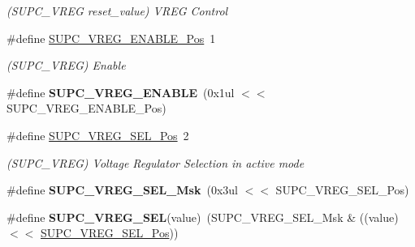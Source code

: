 \begin{DoxyCompactItemize}
\begin{DoxyCompactList}\small\item\em (S\+U\+P\+C\+\_\+\+V\+R\+E\+G reset\+\_\+value) V\+R\+E\+G Control \end{DoxyCompactList}\item 
\hypertarget{group___s_a_m_l21___s_u_p_c_ga02f034caa03f4c23c28006bec76b4ebf}{}\#define \hyperlink{group___s_a_m_l21___s_u_p_c_ga02f034caa03f4c23c28006bec76b4ebf}{S\+U\+P\+C\+\_\+\+V\+R\+E\+G\+\_\+\+E\+N\+A\+B\+L\+E\+\_\+\+Pos}~1\label{group___s_a_m_l21___s_u_p_c_ga02f034caa03f4c23c28006bec76b4ebf}

\begin{DoxyCompactList}\small\item\em (S\+U\+P\+C\+\_\+\+V\+R\+E\+G) Enable \end{DoxyCompactList}\item 
\hypertarget{group___s_a_m_l21___s_u_p_c_ga0f5d73e477b0e4791d17587824160648}{}\#define {\bfseries S\+U\+P\+C\+\_\+\+V\+R\+E\+G\+\_\+\+E\+N\+A\+B\+L\+E}~(0x1ul $<$$<$ S\+U\+P\+C\+\_\+\+V\+R\+E\+G\+\_\+\+E\+N\+A\+B\+L\+E\+\_\+\+Pos)\label{group___s_a_m_l21___s_u_p_c_ga0f5d73e477b0e4791d17587824160648}

\item 
\hypertarget{group___s_a_m_l21___s_u_p_c_gaef51119ae72407e4a6761def82082aad}{}\#define \hyperlink{group___s_a_m_l21___s_u_p_c_gaef51119ae72407e4a6761def82082aad}{S\+U\+P\+C\+\_\+\+V\+R\+E\+G\+\_\+\+S\+E\+L\+\_\+\+Pos}~2\label{group___s_a_m_l21___s_u_p_c_gaef51119ae72407e4a6761def82082aad}

\begin{DoxyCompactList}\small\item\em (S\+U\+P\+C\+\_\+\+V\+R\+E\+G) Voltage Regulator Selection in active mode \end{DoxyCompactList}\item 
\hypertarget{group___s_a_m_l21___s_u_p_c_gae3f9cf54e691fd9cb1fffca846bd211f}{}\#define {\bfseries S\+U\+P\+C\+\_\+\+V\+R\+E\+G\+\_\+\+S\+E\+L\+\_\+\+Msk}~(0x3ul $<$$<$ S\+U\+P\+C\+\_\+\+V\+R\+E\+G\+\_\+\+S\+E\+L\+\_\+\+Pos)\label{group___s_a_m_l21___s_u_p_c_gae3f9cf54e691fd9cb1fffca846bd211f}

\item 
\hypertarget{group___s_a_m_l21___s_u_p_c_gad90863a1de18f25abf15720c6a7e0e2b}{}\#define {\bfseries S\+U\+P\+C\+\_\+\+V\+R\+E\+G\+\_\+\+S\+E\+L}(value)~(S\+U\+P\+C\+\_\+\+V\+R\+E\+G\+\_\+\+S\+E\+L\+\_\+\+Msk \& ((value) $<$$<$ \hyperlink{group___s_a_m_l21___s_u_p_c_gaef51119ae72407e4a6761def82082aad}{S\+U\+P\+C\+\_\+\+V\+R\+E\+G\+\_\+\+S\+E\+L\+\_\+\+Pos}))\label{group___s_a_m_l21___s_u_p_c_gad90863a1de18f25abf15720c6a7e0e2b}


\end{DoxyCompactItemize}
